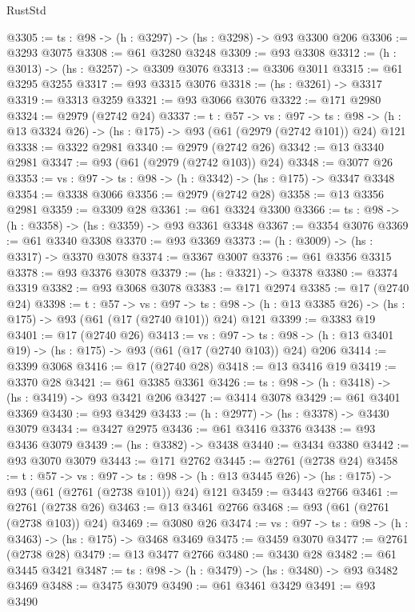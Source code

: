 \begin{lexlean}{RustStd}
\begin{coremodule}
@3305 := {ts : @98} -> (h : @3297) -> (hs : @3298) -> @93 @3300 @206
@3306 := @3293 @3075
@3308 := @61 @3280 @3248
@3309 := @93 @3308
@3312 := (h : @3013) -> (hs : @3257) -> @3309 @3076
@3313 := @3306 @3011
@3315 := @61 @3295 @3255
@3317 := @93 @3315 @3076
@3318 := (hs : @3261) -> @3317
@3319 := @3313 @3259
@3321 := @93 @3066 @3076
@3322 := @171 @2980
@3324 := @2979 (@2742 @24)
@3337 := {t : @57} ->
  {vs : @97} ->
  {ts : @98} -> (h : @13 @3324 @26) -> (hs : @175) -> @93 (@61 (@2979 (@2742 @101)) @24) @121
@3338 := @3322 @2981
@3340 := @2979 (@2742 @26)
@3342 := @13 @3340 @2981
@3347 := @93 (@61 (@2979 (@2742 @103)) @24)
@3348 := @3077 @26
@3353 := {vs : @97} -> {ts : @98} -> (h : @3342) -> (hs : @175) -> @3347 @3348
@3354 := @3338 @3066
@3356 := @2979 (@2742 @28)
@3358 := @13 @3356 @2981
@3359 := @3309 @28
@3361 := @61 @3324 @3300
@3366 := {ts : @98} -> (h : @3358) -> (hs : @3359) -> @93 @3361 @3348
@3367 := @3354 @3076
@3369 := @61 @3340 @3308
@3370 := @93 @3369
@3373 := (h : @3009) -> (hs : @3317) -> @3370 @3078
@3374 := @3367 @3007
@3376 := @61 @3356 @3315
@3378 := @93 @3376 @3078
@3379 := (hs : @3321) -> @3378
@3380 := @3374 @3319
@3382 := @93 @3068 @3078
@3383 := @171 @2974
@3385 := @17 (@2740 @24)
@3398 := {t : @57} ->
  {vs : @97} ->
  {ts : @98} -> (h : @13 @3385 @26) -> (hs : @175) -> @93 (@61 (@17 (@2740 @101)) @24) @121
@3399 := @3383 @19
@3401 := @17 (@2740 @26)
@3413 := {vs : @97} ->
  {ts : @98} -> (h : @13 @3401 @19) -> (hs : @175) -> @93 (@61 (@17 (@2740 @103)) @24) @206
@3414 := @3399 @3068
@3416 := @17 (@2740 @28)
@3418 := @13 @3416 @19
@3419 := @3370 @28
@3421 := @61 @3385 @3361
@3426 := {ts : @98} -> (h : @3418) -> (hs : @3419) -> @93 @3421 @206
@3427 := @3414 @3078
@3429 := @61 @3401 @3369
@3430 := @93 @3429
@3433 := (h : @2977) -> (hs : @3378) -> @3430 @3079
@3434 := @3427 @2975
@3436 := @61 @3416 @3376
@3438 := @93 @3436 @3079
@3439 := (hs : @3382) -> @3438
@3440 := @3434 @3380
@3442 := @93 @3070 @3079
@3443 := @171 @2762
@3445 := @2761 (@2738 @24)
@3458 := {t : @57} ->
  {vs : @97} ->
  {ts : @98} -> (h : @13 @3445 @26) -> (hs : @175) -> @93 (@61 (@2761 (@2738 @101)) @24) @121
@3459 := @3443 @2766
@3461 := @2761 (@2738 @26)
@3463 := @13 @3461 @2766
@3468 := @93 (@61 (@2761 (@2738 @103)) @24)
@3469 := @3080 @26
@3474 := {vs : @97} -> {ts : @98} -> (h : @3463) -> (hs : @175) -> @3468 @3469
@3475 := @3459 @3070
@3477 := @2761 (@2738 @28)
@3479 := @13 @3477 @2766
@3480 := @3430 @28
@3482 := @61 @3445 @3421
@3487 := {ts : @98} -> (h : @3479) -> (hs : @3480) -> @93 @3482 @3469
@3488 := @3475 @3079
@3490 := @61 @3461 @3429
@3491 := @93 @3490

\end{coremodule}
\end{lexlean}

